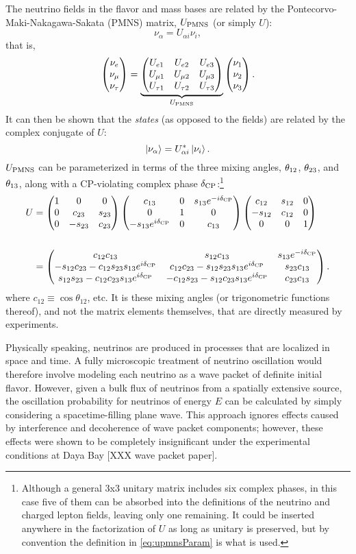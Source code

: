 \documentclass[../thesis.tex]{subfiles}
\begin{document}
The neutrino fields in the flavor and mass bases are related by the Pontecorvo-Maki-Nakagawa-Sakata (PMNS) matrix, $U_\mathrm{PMNS}$ (or simply $U$):
\begin{equation*}
  \nu_\alpha = U_{\alpha i} \nu_i,
\end{equation*}
that is,
\begin{equation*}
  \begin{pmatrix} \nu_e \\ \nu_\mu \\ \nu_\tau \end{pmatrix} = \underbrace{\begin{pmatrix} U_{e 1} & U_{e 2} & U_{e 3} \\ U_{\mu 1} & U_{\mu 2} & U_{\mu 3} \\ U_{\tau 1} & U_{\tau 2} & U_{\tau 3} \end{pmatrix}}_{U_\mathrm{PMNS}} \begin{pmatrix} \nu_1 \\ \nu_2 \\ \nu_3 \end{pmatrix}.
\end{equation*}
It can then be shown that the \emph{states} (as opposed to the fields) are related by the complex conjugate of $U$:
\begin{equation}
  \label{eq:nuStateRel}
  \ket{\nu_\alpha} = U^*_{\alpha i}\ket{\nu_i}.
\end{equation}
$U_\mathrm{PMNS}$ can be parameterized in terms of the three mixing angles, $\theta_{12}$, $\theta_{23}$, and $\theta_{13}$, along with a CP-violating complex phase $\delta_\text{CP}$:\footnote{Although a general 3x3 unitary matrix includes six complex phases, in this case five of them can be absorbed into the definitions of the neutrino and charged lepton fields, leaving only one remaining. It could be inserted anywhere in the factorization of $U$ as long as unitary is preserved, but by convention the definition in \eqref{eq:upmnsParam} is what is used.}
\begin{align}
  \label{eq:upmnsParam}
  \begin{split}
    U &= \begin{pmatrix} 1 & 0 & 0 \\ 0 & c_{23} & s_{23} \\ 0 & -s_{23} & c_{23} \end{pmatrix} \begin{pmatrix} c_{13} & 0 & s_{13}e^{-i\delta_\text{CP}} \\ 0 & 1 & 0 \\ -s_{13}e^{i\delta_\text{CP}} & 0 & c_{13} \end{pmatrix} \begin{pmatrix} c_{12} & s_{12} & 0 \\ -s_{12} & c_{12} & 0 \\ 0 & 0 & 1 \end{pmatrix} \\\\
    &= \begin{pmatrix} c_{12}c_{13} & s_{12} c_{13} & s_{13}e^{-i\delta_\text{CP}} \\ -s_{12}c_{23} - c_{12}s_{23}s_{13}e^{i\delta_\text{CP}} & c_{12}c_{23} - s_{12}s_{23}s_{13}e^{i\delta_\text{CP}} & s_{23}c_{13}\\s_{12}s_{23} - c_{12}c_{23}s_{13}e^{i\delta_\text{CP}} & -c_{12}s_{23} - s_{12}c_{23}s_{13}e^{i\delta_\text{CP}} & c_{23}c_{13} \end{pmatrix}.
  \end{split}
\end{align}
where \(c_{12} \equiv \cos\theta_{12}\), etc. It is these mixing angles (or trigonometric functions thereof), and not the matrix elements themselves, that are directly measured by experiments.

Physically speaking, neutrinos are produced in processes that are localized in space and time. A fully microscopic treatment of neutrino oscillation would therefore involve modeling each neutrino as a wave packet of definite initial flavor. However, given a bulk flux of neutrinos from a spatially extensive source, the oscillation probability for neutrinos of energy $E$ can be calculated by simply considering a spacetime-filling plane wave. This approach ignores effects caused by interference and decoherence of wave packet components; however, these effects were shown to be completely insignificant under the experimental conditions at Daya Bay [XXX wave packet paper].
\end{document}
